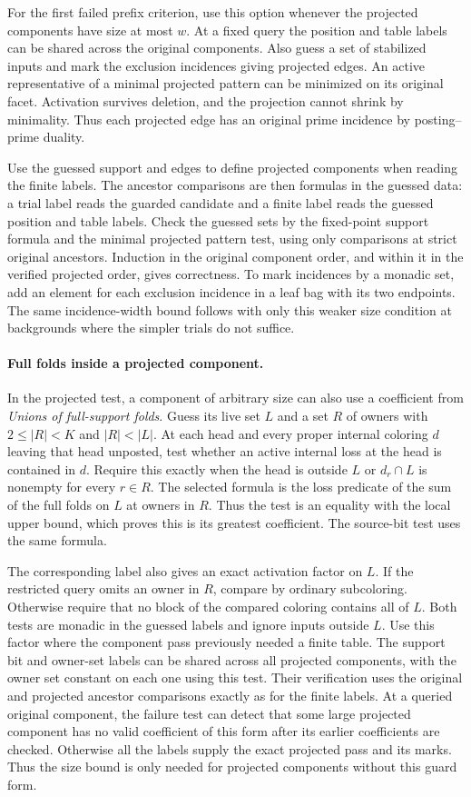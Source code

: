 For the first failed prefix criterion, use this option whenever
the projected components have size at most $w$. At a fixed
query the position and table labels can be shared across the
original components. Also guess a set of stabilized inputs
and mark the exclusion incidences giving projected edges.
An active representative of a minimal projected pattern
can be minimized on its original facet. Activation
survives deletion, and the projection cannot shrink by
minimality. Thus each projected edge has an original
prime incidence by posting--prime duality.

Use the guessed support and edges to define projected
components when reading the finite labels. The ancestor
comparisons are then formulas in the guessed data: a
trial label reads the guarded candidate and a finite
label reads the guessed position and table labels.
Check the guessed sets by the fixed-point support
formula and the minimal projected pattern test, using
only comparisons at strict original ancestors. Induction
in the original component order, and within it in the
verified projected order, gives correctness. To mark
incidences by a monadic set, add an element for each
exclusion incidence in a leaf bag with its two endpoints.
The same incidence-width bound follows with only this
weaker size condition at backgrounds where the simpler
trials do not suffice.

\paragraph{Full folds inside a projected component.}
In the projected test, a component of arbitrary size can
also use a coefficient from \emph{Unions of full-support
folds}. Guess its live set $L$ and a set $R$ of owners
with $2\le |R|<K$ and $|R|<|L|$.
At each head and every proper internal coloring $d$
leaving that head unposted, test whether an active
internal loss at the head is contained in $d$.
Require this exactly when the head is outside $L$
or $d_r\cap L$ is nonempty for every $r\in R$.
The selected formula is the loss predicate of the
sum of the full folds on $L$ at owners in $R$. Thus the test is an
equality with the local upper bound, which proves this
is its greatest coefficient. The source-bit test
uses the same formula.

The corresponding label also gives an exact activation
factor on $L$. If the restricted query omits an owner
in $R$, compare by ordinary subcoloring. Otherwise
require that no block of the compared coloring contains
all of $L$. Both tests are monadic in the guessed labels
and ignore inputs outside $L$. Use this factor where
the component pass previously needed a finite table.
The support bit and owner-set labels can be shared
across all projected components, with the owner set constant
on each one using this test. Their verification uses the
original and projected ancestor comparisons exactly as
for the finite labels. At a queried original component,
the failure test can detect that some large projected
component has no valid coefficient of this form after
its earlier coefficients are checked. Otherwise all the
labels supply the exact projected pass and its marks.
Thus the size bound is only needed for projected
components without this guard form.

